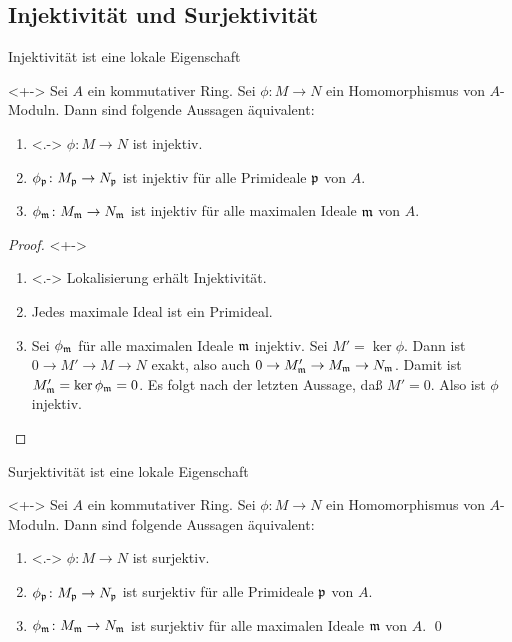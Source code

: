 \subsection{Injektivität und Surjektivität}

\begin{frame}{Injektivität ist eine lokale Eigenschaft}
	\begin{proposition}<+->
		\label{prop:inj_is_local}
		Sei \(A\) ein kommutativer Ring. Sei \(\phi\colon M \to N\) ein
		Homomorphismus von \(A\)-Moduln. Dann
		sind folgende Aussagen äquivalent:
		\begin{enumerate}[<+->]
		\item<.->
			\(\phi\colon M \to N\) ist injektiv.
		\item
			\(\phi_{\mathfrak{p}}\colon M_{\mathfrak{p}} \to N_{\mathfrak{p}}\) ist injektiv für alle Primideale \(\mathfrak{p}\) von \(A\).
		\item
			\(\phi_{\mathfrak{m}}\colon M_{\mathfrak{m}} \to N_{\mathfrak{m}}\) ist injektiv für alle maximalen Ideale \(\mathfrak{m}\) von \(A\).
		\end{enumerate}
	\end{proposition}
	\begin{proof}<+->
		\begin{enumerate}[<+->]
		\item<.->
			Lokalisierung erhält Injektivität.
		\item
			Jedes maximale Ideal ist ein Primideal.
		\item
			Sei \(\phi_{\mathfrak{m}}\) für alle maximalen Ideale \(\mathfrak{m}\) injektiv. Sei \(M' = \ker \phi\).
			Dann ist \(0 \to M' \to M \to N\) exakt, also auch \(0 \to M'_{\mathfrak{m}} \to M_{\mathfrak{m}} \to N_{\mathfrak{m}}\).
			Damit ist \(M'_{\mathfrak{m}} = \ker \phi_{\mathfrak{m}} = 0\). Es folgt nach der letzten Aussage, daß \(M' = 0\).
			Also ist \(\phi\) injektiv.
			\qedhere
		\end{enumerate}
	\end{proof}
\end{frame}

\begin{frame}{Surjektivität ist eine lokale Eigenschaft}
	\begin{proposition}<+->
		Sei \(A\) ein kommutativer Ring. Sei \(\phi\colon M \to N\) ein Homomorphismus von \(A\)-Moduln. Dann
		sind folgende Aussagen äquivalent:
		\begin{enumerate}[<+->]
		\item<.->
			\(\phi\colon M \to N\) ist surjektiv.
		\item
			\(\phi_{\mathfrak{p}}\colon M_{\mathfrak{p}} \to N_{\mathfrak{p}}\) ist surjektiv für alle Primideale \(\mathfrak{p}\) von \(A\).
		\item
			\(\phi_{\mathfrak{m}}\colon M_{\mathfrak{m}} \to N_{\mathfrak{m}}\) ist surjektiv für alle maximalen Ideale \(\mathfrak{m}\) von \(A\).
			\qed
		\end{enumerate}
	\end{proposition}
\end{frame}

